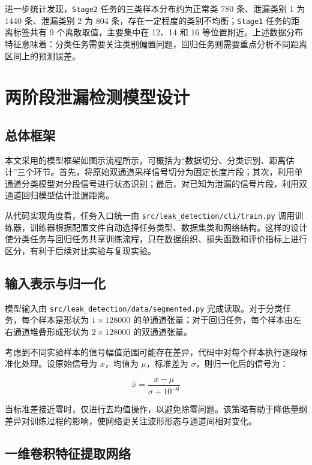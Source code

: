 进一步统计发现，\texttt{Stage2} 任务的三类样本分布约为正常类 780 条、泄漏类别 1 为 1440 条、泄漏类别 2 为 804 条，存在一定程度的类别不均衡；\texttt{Stage1} 任务的距离标签共有 9 个离散取值，主要集中在 12、14 和 16 等位置附近。上述数据分布特征意味着：分类任务需要关注类别偏置问题，回归任务则需要重点分析不同距离区间上的预测误差。

\chapter{两阶段泄漏检测模型设计}

\section{总体框架}

本文采用的模型框架如图示流程所示，可概括为“数据切分、分类识别、距离估计”三个环节。首先，将原始双通道采样信号切分为固定长度片段；其次，利用单通道分类模型对分段信号进行状态识别；最后，对已知为泄漏的信号片段，利用双通道回归模型估计泄漏距离。

从代码实现角度看，任务入口统一由 \texttt{src/leak\_detection/cli/train.py} 调用训练器，训练器根据配置文件自动选择任务类型、数据集类和网络结构。这样的设计使分类任务与回归任务共享训练流程，只在数据组织、损失函数和评价指标上进行区分，有利于后续对比实验与复现实验。

\section{输入表示与归一化}

模型输入由 \texttt{src/leak\_detection/data/segmented.py} 完成读取。对于分类任务，每个样本是形状为 $1 \times 128000$ 的单通道张量；对于回归任务，每个样本由左右通道堆叠形成形状为 $2 \times 128000$ 的双通道张量。

考虑到不同实验样本的信号幅值范围可能存在差异，代码中对每个样本执行逐段标准化处理。设原始信号为 $x$，均值为 $\mu$，标准差为 $\sigma$，则归一化后的信号为：

\begin{equation}
\hat{x} = \frac{x - \mu}{\sigma + 10^{-6}}
\end{equation}

当标准差接近零时，仅进行去均值操作，以避免除零问题。该策略有助于降低量纲差异对训练过程的影响，使网络更关注波形形态与通道间相对变化。

\section{一维卷积特征提取网络}

